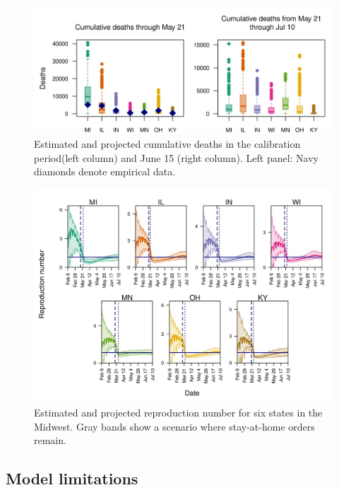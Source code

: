 \documentclass[11pt]{article}
\begin{document}
\begin{figure}[hb!]
\centering
\includegraphics[width=\textwidth]{../figures/report_figure_deaths_cumulative.jpeg} 
\caption{\label{fig_deaths_cumulative}Estimated and projected cumulative deaths in the calibration period(left column) and June 15 (right column). Left panel: Navy diamonds denote empirical data.}
\end{figure}


\begin{figure}[hb!]
\centering
\includegraphics[width=\textwidth]{../figures/report_figure_reproduction_number.jpeg} 
\caption{\label{fig_reproduction_number} Estimated and projected reproduction number for six states in the Midwest. Gray bands show a scenario where stay-at-home orders remain.}
\end{figure}



\subsection{Model limitations}
\end{document}
